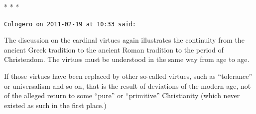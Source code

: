 
\begin{center}* * *\end{center}

\begin{footnotesize}
\begin{sffamily}
\texttt{Cologero on 2011-02-19 at 10:33 said:}

The discussion on the cardinal virtues again illustrates the continuity from the ancient Greek tradition to the ancient Roman tradition to the period of Christendom. The virtues must be understood in the same way from age to age.

If those virtues have been replaced by other so-called virtues, such as ``tolerance'' or universalism and so on, that is the result of deviations of the modern age, not of the alleged return to some ``pure'' or ``primitive'' Christianity (which never existed as such in the first place.)


\hfill

\end{sffamily}
\end{footnotesize}

